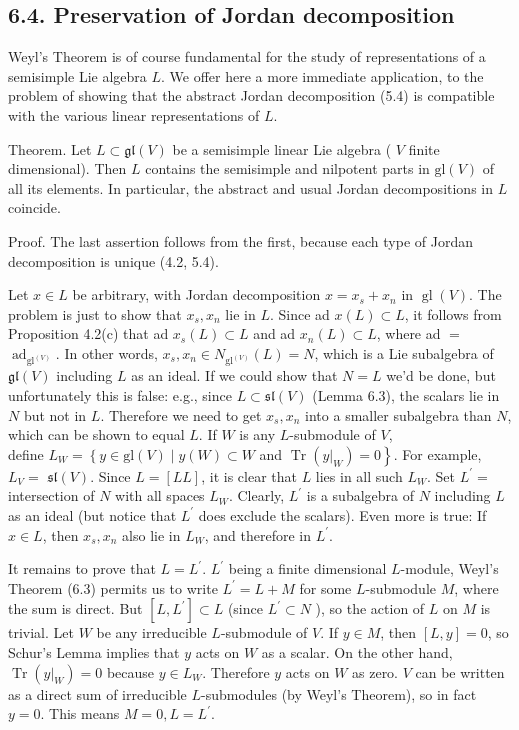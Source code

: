 \documentclass[10pt]{article}
\begin{document}
\subsection*{6.4. Preservation of Jordan decomposition}
Weyl's Theorem is of course fundamental for the study of representations of a semisimple Lie algebra $L$. We offer here a more immediate application, to the problem of showing that the abstract Jordan decomposition (5.4) is compatible with the various linear representations of $L$.

Theorem. Let $L \subset \mathfrak{g l}(V)$ be a semisimple linear Lie algebra ( $V$ finite dimensional). Then $L$ contains the semisimple and nilpotent parts in $\mathrm{gl}(V)$ of all its elements. In particular, the abstract and usual Jordan decompositions in $L$ coincide.

Proof. The last assertion follows from the first, because each type of Jordan decomposition is unique (4.2, 5.4).

Let $x \in L$ be arbitrary, with Jordan decomposition $x=x_{s}+x_{n}$ in $\operatorname{gl}(V)$. The problem is just to show that $x_{s}, x_{n}$ lie in $L$. Since ad $x(L) \subset L$, it follows from Proposition 4.2(c) that ad $x_{s}(L) \subset L$ and ad $x_{n}(L) \subset L$, where ad $=$ $\operatorname{ad}_{\mathrm{gl}^{(V)}}$. In other words, $x_{s}, x_{n} \in N_{\mathrm{gl}^{(V)}}(L)=N$, which is a Lie subalgebra of $\mathfrak{g l}(V)$ including $L$ as an ideal. If we could show that $N=L$ we'd be done, but unfortunately this is false: e.g., since $L \subset \mathfrak{s l}(V)$ (Lemma 6.3), the scalars lie in $N$ but not in $L$. Therefore we need to get $x_{s}, x_{n}$ into a smaller subalgebra than $N$, which can be shown to equal $L$. If $W$ is any $L$-submodule of $V$,\\
define $L_{W}=\left\{y \in \mathrm{gl}(V) \mid y(W) \subset W\right.$ and $\left.\operatorname{Tr}\left(\left.y\right|_{W}\right)=0\right\}$. For example, $L_{V}=$ $\mathfrak{s l}(V)$. Since $L=[L L]$, it is clear that $L$ lies in all such $L_{W}$. Set $L^{\prime}=$ intersection of $N$ with all spaces $L_{W}$. Clearly, $L^{\prime}$ is a subalgebra of $N$ including $L$ as an ideal (but notice that $L^{\prime}$ does exclude the scalars). Even more is true: If $x \in L$, then $x_{s}, x_{n}$ also lie in $L_{W}$, and therefore in $L^{\prime}$.

It remains to prove that $L=L^{\prime}$. $L^{\prime}$ being a finite dimensional $L$-module, Weyl's Theorem (6.3) permits us to write $L^{\prime}=L+M$ for some $L$-submodule $M$, where the sum is direct. But $\left[L, L^{\prime}\right] \subset L$ (since $L^{\prime} \subset N$ ), so the action of $L$ on $M$ is trivial. Let $W$ be any irreducible $L$-submodule of $V$. If $y \in M$, then $[L, y]=0$, so Schur's Lemma implies that $y$ acts on $W$ as a scalar. On the other hand, $\operatorname{Tr}\left(\left.y\right|_{W}\right)=0$ because $y \in L_{W}$. Therefore $y$ acts on $W$ as zero. $V$ can be written as a direct sum of irreducible $L$-submodules (by Weyl's Theorem), so in fact $y=0$. This means $M=0, L=L^{\prime}$.
\end{document}

